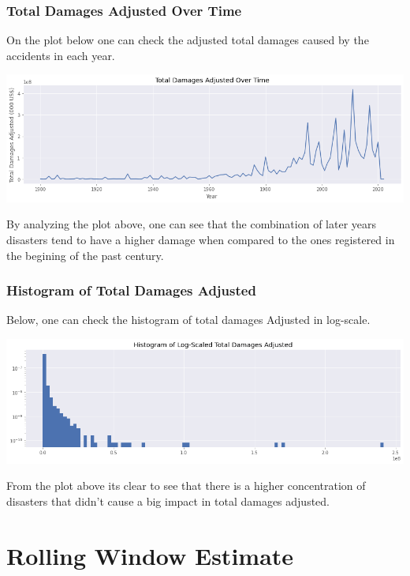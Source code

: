 \documentclass[paper=a4, fontsize=11pt]{scrartcl} %
\begin{document}
\subsubsection{Total Damages Adjusted Over Time}

On the plot below one can check the adjusted total damages caused by the accidents in each year.

\begin{center}
    \includegraphics[scale=0.5]{imgs/total_damages_adjusted_over_time.png}
\end{center}

By analyzing the plot above, one can see that the combination of later years disasters tend to have a higher damage when compared to the ones registered in the begining of the past century.

\subsubsection{Histogram of Total Damages Adjusted}

Below, one can check the histogram of total damages Adjusted in log-scale.

\begin{center}
    \includegraphics[scale=0.5]{imgs/histogram_log_scaled_total_damages_adjusted.png}
\end{center}

From the plot above its clear to see that there is a higher concentration of disasters that didn't cause a big impact in total damages adjusted.

\section{Rolling Window Estimate}
\end{document}
